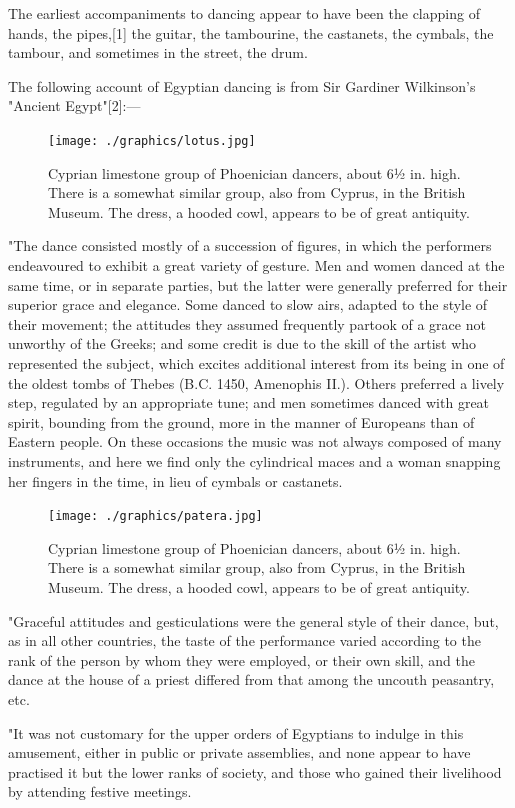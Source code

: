 \begin{dispListing}
The earliest accompaniments to dancing appear to have been the clapping of hands, the pipes,[1] the guitar, the tambourine, the castanets, the cymbals, the tambour, and sometimes in the street, the drum.

The following account of Egyptian dancing is from Sir Gardiner Wilkinson's "Ancient Egypt"[2]:—
\begin{figure}
   \texttt{[image: ./graphics/lotus.jpg]} 
   \caption{Cyprian limestone group of Phoenician dancers, about 6½ in. high. There is a somewhat similar group, also from Cyprus, in the British Museum. The dress, a hooded cowl, appears to be of great antiquity.}
\end{figure}
"The dance consisted mostly of a succession of figures, in which the performers endeavoured to exhibit a great variety of gesture. Men and women danced at the same time, or in separate parties, but the latter were generally preferred for their superior grace and elegance. Some danced to slow airs, adapted to the style of their movement; the attitudes they assumed frequently partook of a grace not unworthy of the Greeks; and some credit is due to the skill of the artist who represented the subject, which excites additional interest from its being in one of the oldest tombs of Thebes (B.C. 1450, Amenophis II.). Others preferred a lively step, regulated by an appropriate tune; and men sometimes danced with great spirit, bounding from the ground, more in the manner of Europeans than of Eastern people. On these occasions the music was not always composed of many instruments, and here we find only the cylindrical maces and a woman snapping her fingers in the time, in lieu of cymbals or castanets.

\begin{figure}
   \texttt{[image: ./graphics/patera.jpg]} 
   \caption{Cyprian limestone group of Phoenician dancers, about 6½ in. high. There is a somewhat similar group, also from Cyprus, in the British Museum. The dress, a hooded cowl, appears to be of great antiquity.}
\end{figure}

"Graceful attitudes and gesticulations were the general style of their dance, but, as in all other countries, the taste of the performance varied according to the rank of the person by whom they were employed, or their own skill, and the dance at the house of a priest differed from that among the uncouth peasantry, etc.

"It was not customary for the upper orders of Egyptians to indulge in this amusement, either in public or private assemblies, and none appear to have practised it but the lower ranks of society, and those who gained their livelihood by attending festive meetings.


\end{dispListing}
